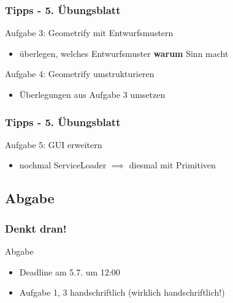 \documentclass[18pt]{beamer}
\begin{document}
	\begin{frame}
		\frametitle{Tipps - 5. Übungsblatt}
			\begin{exampleblock}{Aufgabe 3: Geometrify mit Entwurfsmustern}
				\begin{itemize}
					\item überlegen, welches Entwurfsmuster \textbf{warum} Sinn macht
				\end{itemize}
			\end{exampleblock}
			\pause
			\begin{exampleblock}{Aufgabe 4: Geometrify umstrukturieren}
				\begin{itemize}
					\item Überlegungen aus Aufgabe 3 umsetzen
				\end{itemize}
			\end{exampleblock}
	\end{frame}

	\begin{frame}
		\frametitle{Tipps - 5. Übungsblatt}
		\begin{exampleblock}{Aufgabe 5: GUI erweitern}
			\begin{itemize}
				\item nochmal ServiceLoader
			 	 $\implies$ diesmal mit Primitiven
			\end{itemize}
		\end{exampleblock}
	\end{frame}
	
	\subsection{Abgabe}
	\begin{frame}
		\frametitle{Denkt dran!}
		\begin{alertblock}{Abgabe}
			\begin{itemize}
				\item Deadline am 5.7. um 12:00
				\item Aufgabe 1, 3 handschriftlich (wirklich handschriftlich!)
			\end{itemize}
		\end{alertblock}
	\end{frame}
		
\end{document}
